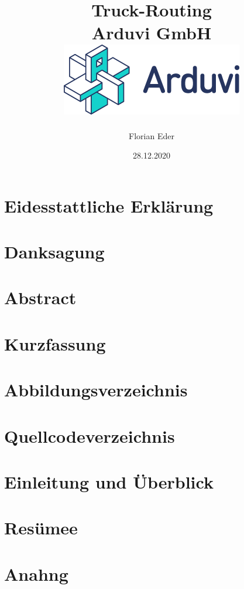 \documentclass[12pt]{report}
\title {
    {Truck-Routing}\\
    {\large Arduvi GmbH}\\
    {\includegraphics{ArduviLogoWithText.png}}
}
\author{Florian Eder}
\date{28.12.2020}
\begin{document}
    \maketitle

    \chapter*{Eidesstattliche Erklärung}
    

    \chapter*{Danksagung}
    

    \chapter*{Abstract}
    

    \chapter*{Kurzfassung}
    

    \tableofcontents

    \chapter*{Abbildungsverzeichnis}
    

    \chapter*{Quellcodeverzeichnis}
    


    \chapter{Einleitung und Überblick}
    







    \chapter{Resümee}
    

    \chapter{Anahng}
    
    
\end{document}

